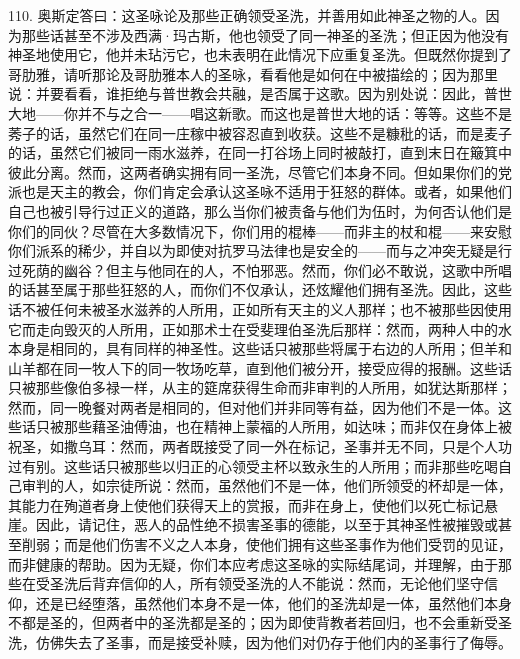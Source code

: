 110. 奥斯定答曰：这圣咏论及那些正确领受圣洗，并善用如此神圣之物的人。因为那些话甚至不涉及西满·玛古斯，他也领受了同一神圣的圣洗；但正因为他没有神圣地使用它，他并未玷污它，也未表明在此情况下应重复圣洗。但既然你提到了哥肋雅，请听那论及哥肋雅本人的圣咏，看看他是如何在中被描绘的；因为那里说：并要看看，谁拒绝与普世教会共融，是否属于这歌。因为别处说：因此，普世大地——你并不与之合一——唱这新歌。而这也是普世大地的话：等等。这些不是莠子的话，虽然它们在同一庄稼中被容忍直到收获。这些不是糠秕的话，而是麦子的话，虽然它们被同一雨水滋养，在同一打谷场上同时被敲打，直到末日在簸箕中彼此分离。然而，这两者确实拥有同一圣洗，尽管它们本身不同。但如果你们的党派也是天主的教会，你们肯定会承认这圣咏不适用于狂怒的群体。或者，如果他们自己也被引导行过正义的道路，那么当你们被责备与他们为伍时，为何否认他们是你们的同伙？尽管在大多数情况下，你们用的棍棒——而非主的杖和棍——来安慰你们派系的稀少，并自以为即使对抗罗马法律也是安全的——而与之冲突无疑是行过死荫的幽谷？但主与他同在的人，不怕邪恶。然而，你们必不敢说，这歌中所唱的话甚至属于那些狂怒的人，而你们不仅承认，还炫耀他们拥有圣洗。因此，这些话不被任何未被圣水滋养的人所用，正如所有天主的义人那样；也不被那些因使用它而走向毁灭的人所用，正如那术士在受斐理伯圣洗后那样：然而，两种人中的水本身是相同的，具有同样的神圣性。这些话只被那些将属于右边的人所用；但羊和山羊都在同一牧人下的同一牧场吃草，直到他们被分开，接受应得的报酬。这些话只被那些像伯多禄一样，从主的筵席获得生命而非审判的人所用，如犹达斯那样；然而，同一晚餐对两者是相同的，但对他们并非同等有益，因为他们不是一体。这些话只被那些藉圣油傅油，也在精神上蒙福的人所用，如达味；而非仅在身体上被祝圣，如撒乌耳：然而，两者既接受了同一外在标记，圣事并无不同，只是个人功过有别。这些话只被那些以归正的心领受主杯以致永生的人所用；而非那些吃喝自己审判的人，如宗徒所说：然而，虽然他们不是一体，他们所领受的杯却是一体，其能力在殉道者身上使他们获得天上的赏报，而非在身上，使他们以死亡标记悬崖。因此，请记住，恶人的品性绝不损害圣事的德能，以至于其神圣性被摧毁或甚至削弱；而是他们伤害不义之人本身，使他们拥有这些圣事作为他们受罚的见证，而非健康的帮助。因为无疑，你们本应考虑这圣咏的实际结尾词，并理解，由于那些在受圣洗后背弃信仰的人，所有领受圣洗的人不能说：然而，无论他们坚守信仰，还是已经堕落，虽然他们本身不是一体，他们的圣洗却是一体，虽然他们本身不都是圣的，但两者中的圣洗都是圣的；因为即使背教者若回归，也不会重新受圣洗，仿佛失去了圣事，而是接受补赎，因为他们对仍存于他们内的圣事行了侮辱。\par

